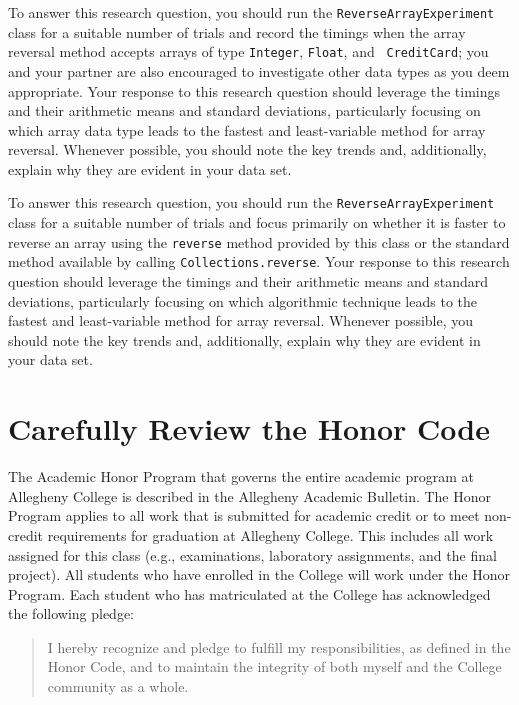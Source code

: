  To
answer this research question, you should run the {\tt ReverseArrayExperiment} class for a suitable number of trials and
record the timings when the array reversal method accepts arrays of type {\tt Integer}, {\tt Float}, and {\tt
CreditCard}; you and your partner are also encouraged to investigate other data types as you deem appropriate. Your
response to this research question should leverage the timings and their arithmetic means and standard deviations,
particularly focusing on which array data type leads to the fastest and least-variable method for array reversal.
Whenever possible, you should note the key trends and, additionally, explain why they are evident in your data set.

 To answer this research question, you should run the {\tt ReverseArrayExperiment} class for a suitable number
of trials and focus primarily on whether it is faster to reverse an array using the {\tt reverse} method provided by
this class or the standard method available by calling {\tt Collections.reverse}.  Your response to this research
question should leverage the timings and their arithmetic means and standard deviations, particularly focusing on which
algorithmic technique leads to the fastest and least-variable method for array reversal. Whenever possible, you should
note the key trends and, additionally, explain why they are evident in your data set.

\section*{Carefully Review the Honor Code}

The Academic Honor Program that governs the entire academic program at Allegheny College is described in the Allegheny
Academic Bulletin.  The Honor Program applies to all work that is submitted for academic credit or to meet non-credit
requirements for graduation at Allegheny College. This includes all work assigned for this class (e.g., examinations,
laboratory assignments, and the final project). All students who have enrolled in the College will work under the Honor
Program.  Each student who has matriculated at the College has acknowledged the following pledge:

\vspace*{-.1in}
\begin{quote}
  I hereby recognize and pledge to fulfill my responsibilities, as defined in the Honor Code, and to maintain the
  integrity of both myself and the College community as a whole.
\end{quote}
\vspace*{-.1in}

